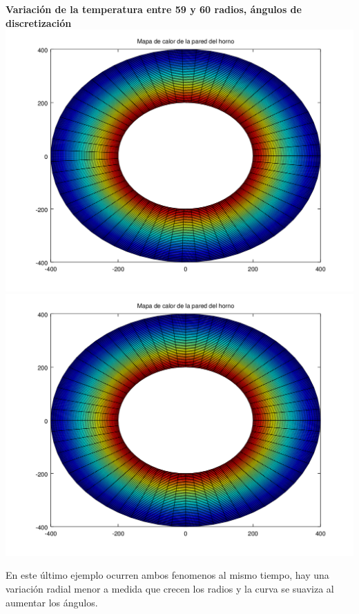 \begin{enumerate}
		\textbf{Variación de la temperatura entre 59 y 60 radios, ángulos de discretización}\\
	  	\includegraphics[scale=0.35]{experimentos1a_1b/evolucion_posicion_isoterma_temperatura/variacion_radios_angulos_se_reduce_diferencia_radial/test11_testord_045_inst_001_heatmap.png}
		\includegraphics[scale=0.35]{experimentos1a_1b/evolucion_posicion_isoterma_temperatura/variacion_radios_angulos_se_reduce_diferencia_radial/test11_testord_046_inst_001_heatmap.png}
\FloatBarrier
\vspace{0.5cm}

En este último ejemplo ocurren ambos fenomenos al mismo tiempo, hay una variación radial menor a medida que crecen los radios y la curva se suaviza al aumentar los ángulos.

\end{enumerate}

